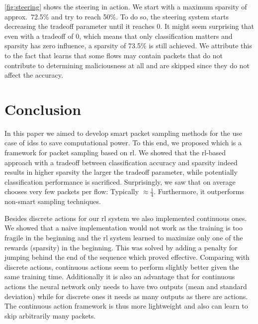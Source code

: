 \documentclass[conference]{IEEEtran}
\begin{document}
\autoref{fig:steering} shows the steering in action. We start with a maximum sparsity of approx.~72.5\% and try to reach 50\%. To do so, the steering system starts decreasing the tradeoff parameter until it reaches 0. It might seem surprising that even with a tradeoff of 0, which means that only classification matters and sparsity has zero influence, a sparsity of 73.5\% is still achieved. We attribute this to the fact that \ours{} learns that some flows may contain packets that do not contribute to determining maliciousness at all and are skipped since they do not affect the accuracy. %


\section{Conclusion}
\label{sec:conclusion}
In this paper we aimed to develop smart packet sampling methods for the use case of \glspl{ids} to save computational power. To this end, we proposed \ours{} which is a framework for packet sampling based on \gls{rl}. We showed that the \gls{rl}-based approach with a tradeoff between classification accuracy and sparsity indeed results in higher sparsity the larger the tradeoff parameter, while potentially classification performance is sacrificed. Surprisingly, we saw that \ours{} on average chooses very few packets per flow: Typically $\approx \frac{1}{4}$. Furthermore, it outperforms non-smart sampling techniques.

Besides discrete actions for our \gls{rl} system we also implemented continuous ones. We showed that a naive implementation would not work as the training is too fragile in the beginning and the \gls{rl} system learned to maximize only one of the rewards (sparsity) in the beginning. This was solved by adding a penalty for jumping behind the end of the sequence which proved effective. Comparing with discrete actions, continuous actions seem to perform slightly better given the same training time. Additionally it is also an advantage that for continuous actions the neural network only needs to have two outputs (mean and standard deviation) while for discrete ones it needs as many outputs as there are actions. The continuous action framework is thus more lightweight and also can learn to skip arbitrarily many packets.
\end{document}
